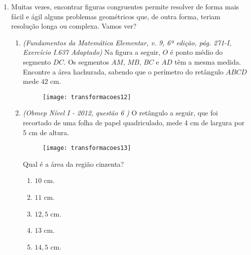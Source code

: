 \begin{enumerate}
\item Muitas vezes, encontrar figuras congruentes permite resolver de forma mais fácil e ágil alguns problemas geométricos que, de outra forma, teriam resolução longa ou complexa. Vamos ver?
\begin{enumerate}
\item \textit{(Fundamentos da Matemática Elementar, v. 9, 6ª edição, pág. 271-I, Exercício I.637 Adaptado)} Na figura a seguir, $O$ é ponto médio do segmento $DC$. Os segmentos $AM$, $MB$, $BC$ e $AD$ têm a mesma medida. Encontre a área hachurada, sabendo que o perímetro do retângulo $ABCD$ mede $42$ cm.  

\begin{figure}[H]
\centering

\texttt{[image: transformacoes12]}
\end{figure} 

\item \textit{(Obmep Nível I - 2012, questão 6 )} O retângulo a seguir, que foi recortado de uma folha de papel quadriculado, mede 4 cm de largura por 5 cm de altura. 
 
\begin{figure}[H]
\centering

\texttt{[image: transformacoes13]}
\end{figure}

Qual é a área da região cinzenta?
\begin{enumerate}
\item $10$ cm. 
\item $11$ cm.
\item $12{,}5$ cm.
\item $13$ cm.
\item $14{,}5$ cm.
\end{enumerate}
\end{enumerate}
\end{enumerate}

